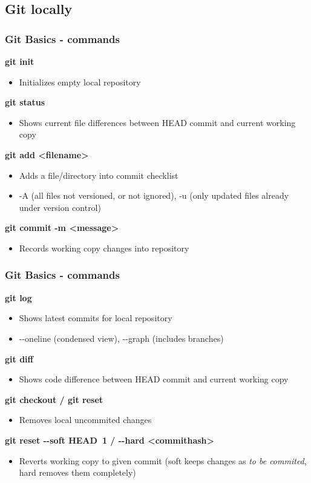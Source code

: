 \subsection[]{Git locally}
\begin{frame}
\frametitle{Git Basics - commands}

\textbf{git init}
	\begin{itemize}
	\item Initializes empty local repository
	\end{itemize}
\textbf{git status}
	\begin{itemize}
	\item Shows current file differences between HEAD commit and current working copy
	\end{itemize}
\textbf{git add <filename>}
	\begin{itemize}
	\item Adds a file/directory into commit checklist
	\item -A (all files not versioned, or not ignored), -u (only updated files already under version control)
	\end{itemize}
\textbf{git commit -m <message>}
	\begin{itemize}
	\item Records working copy changes into repository
	\end{itemize}
\end{frame}

\begin{frame}
\frametitle{Git Basics - commands}

\textbf{git log}
	\begin{itemize}
	\item Shows latest commits for local repository
	\item -{}-oneline (condensed view), -{}-graph (includes branches)
	\end{itemize}
\textbf{git diff}
	\begin{itemize}
	\item Shows code difference between HEAD commit and current working copy
	\end{itemize}
\textbf{git checkout / git reset}
	\begin{itemize}
	\item Removes local uncommited changes
	\end{itemize}
\textbf{git reset -{}-soft HEAD~1 / -{}-hard <commithash>}
	\begin{itemize}
	\item Reverts working copy to given commit (soft keeps changes as \emph{to be commited}, hard removes them completely)
	\end{itemize}
\end{frame}

